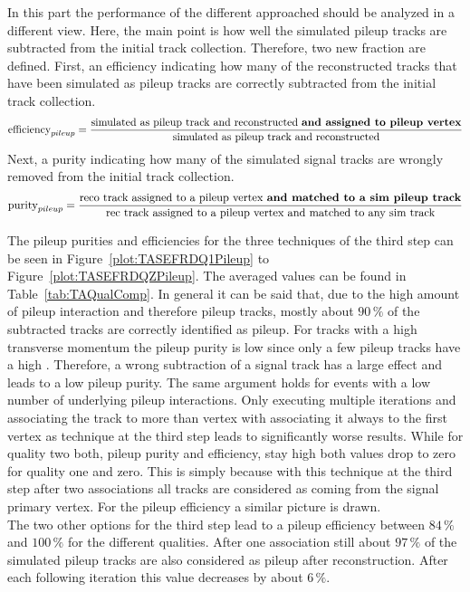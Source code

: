 In this part the performance of the different approached should be analyzed in a different view. Here, the main point is how well the simulated pileup tracks are subtracted from the initial track collection. Therefore, two new fraction are defined. First, an efficiency indicating how many of the reconstructed tracks that have been simulated as pileup tracks are correctly subtracted from the initial track collection. 
\begin{equation}
\textrm{efficiency}_{pileup} = \frac{\textrm{simulated as pileup track and reconstructed \textbf{and assigned to pileup vertex}}}{\textrm{simulated as pileup track and reconstructed}}
\label{eq:PUEfficiency}
\end{equation}
Next, a purity indicating how many of the simulated signal tracks are wrongly removed from the initial track collection.
\begin{equation}
\textrm{purity}_{pileup} = \frac{\textrm{reco track assigned to a pileup vertex \textbf{and matched to a sim pileup track}}}{\textrm{rec track assigned to a pileup vertex and matched to any sim track}}
\label{eq:PUPurity}
\end{equation}

The pileup purities and efficiencies for the three techniques of the third step can be seen in Figure~\ref{plot:TASEFRDQ1Pileup} to Figure~\ref{plot:TASEFRDQZPileup}. The averaged values can be found in Table~\ref{tab:TAQualComp}. In general it can be said that, due to the high amount of pileup interaction and therefore pileup tracks, mostly about $90\,\%$ of the subtracted tracks are correctly identified as pileup. For tracks with a high transverse momentum the pileup purity is low since only a few pileup tracks have a high \pt. Therefore, a wrong subtraction of a signal track has a large effect and leads to a low pileup purity. The same argument holds for events with a low number of underlying pileup interactions. Only executing multiple iterations and associating the track to more than vertex with associating it always to the first vertex as technique at the third step leads to significantly worse results. While for quality two both, pileup purity and efficiency, stay high both values drop to zero for quality one and zero. This is simply because with this technique at the third step after two associations all tracks are considered as coming from the signal primary vertex. For the pileup efficiency a similar picture is drawn. \\
The two other options for the third step lead to a pileup efficiency between $84\,\%$ and $100\,\%$ for the different qualities. After one association still about $97\,\%$ of the simulated pileup tracks are also considered as pileup after reconstruction. After each following iteration this value decreases by about $6\,\%$.

